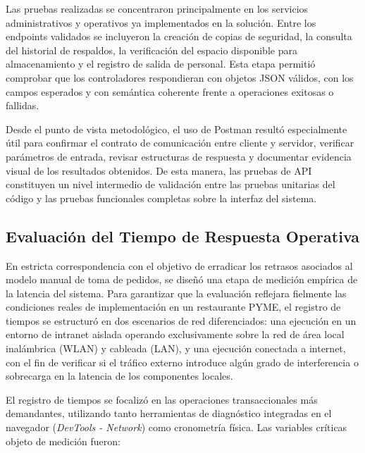 Las pruebas realizadas se concentraron principalmente en los servicios administrativos y operativos ya implementados en la solución. Entre los endpoints validados se incluyeron la creación de copias de seguridad, la consulta del historial de respaldos, la verificación del espacio disponible para almacenamiento y el registro de salida de personal. Esta etapa permitió comprobar que los controladores respondieran con objetos JSON válidos, con los campos esperados y con semántica coherente frente a operaciones exitosas o fallidas.

Desde el punto de vista metodológico, el uso de Postman resultó especialmente útil para confirmar el contrato de comunicación entre cliente y servidor, verificar parámetros de entrada, revisar estructuras de respuesta y documentar evidencia visual de los resultados obtenidos. De esta manera, las pruebas de API constituyen un nivel intermedio de validación entre las pruebas unitarias del código y las pruebas funcionales completas sobre la interfaz del sistema.

\subsection{Evaluación del Tiempo de Respuesta Operativa}

En estricta correspondencia con el objetivo de erradicar los retrasos asociados al modelo manual de toma de pedidos, se diseñó una etapa de medición empírica de la latencia del sistema. Para garantizar que la evaluación reflejara fielmente las condiciones reales de implementación en un restaurante PYME, el registro de tiempos se estructuró en dos escenarios de red diferenciados: una ejecución en un entorno de intranet aislada operando exclusivamente sobre la red de área local inalámbrica (WLAN) y cableada (LAN), y una ejecución conectada a internet, con el fin de verificar si el tráfico externo introduce algún grado de interferencia o sobrecarga en la latencia de los componentes locales.

El registro de tiempos se focalizó en las operaciones transaccionales más demandantes, utilizando tanto herramientas de diagnóstico integradas en el navegador (\textit{DevTools - Network}) como cronometría física. Las variables críticas objeto de medición fueron:

